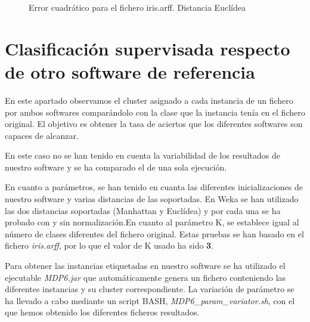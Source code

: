 \documentclass[a4paper]{report}
\begin{document}
	
	\begin{figure}[htbp]
	\begin{center}
	\end{center}
	\caption{Error cuadrático para el fichero iris.arff. Distancia Euclídea}
	\label{rescompiris}
	\end{figure}
	

	
	
	\FloatBarrier
	\section{Clasificación supervisada respecto de otro software de referencia}
	\label{resprecision}
	En este apartado observamos el cluster asignado a cada instancia de un fichero por ambos softwares comparándolo con la clase que la instancia tenía en el fichero original. El objetivo es obtener la tasa de aciertos que los diferentes softwares son capaces de alcanzar.
	
	En este caso no se han tenido en cuenta la variabilidad de los resultados de nuestro software y se ha comparado el de una sola ejecución.
	
	En cuanto a parámetros, se han tenido en cuanta las diferentes inicializaciones de nuestro software y varias distancias de las soportadas. En Weka se han utilizado las dos distancias soportadas (Manhattan y Euclídea) y por cada una se ha probado con y sin normalización.En cuanto al parámetro K, se establece igual al número de clases diferentes del fichero original. Estas pruebas se han basado en el fichero \textit{iris.arff}, por lo que el valor de K usado ha sido \textbf{3}.
	
	Para obtener las instancias etiquetadas en nuestro software se ha utilizado el ejecutable \textit{MDP6.jar} que automáticamente genera un fichero conteniendo las diferentes instancias y su cluster correspondiente. La variación de parámetro se ha llevado a cabo mediante un script BASH, \textit{MDP6\_param\_variator.sh},  con el que hemos obtenido los diferentes ficheros resultados.
	
\end{document}
